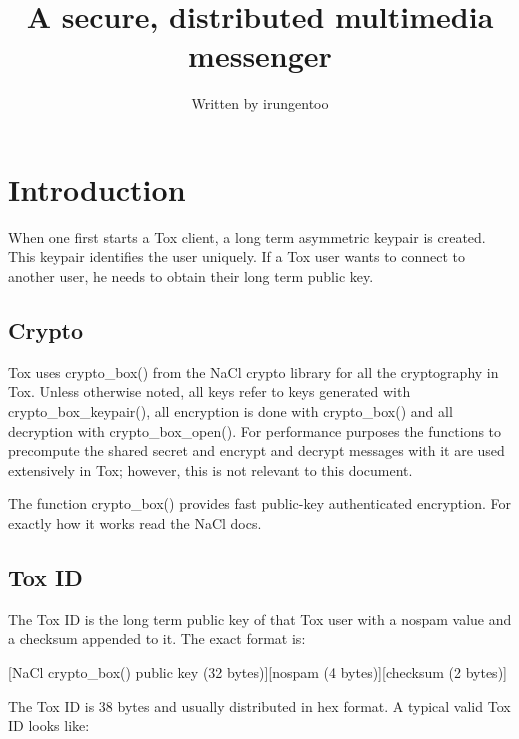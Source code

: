 \documentclass{tox}
\begin{document}
\title{A secure, distributed multimedia messenger}


\author{Written by irungentoo} %

\maketitle

\tableofcontents
\clearpage

\section{Introduction}

When one first starts a Tox client, a long term asymmetric keypair is created. 
This keypair identifies the user uniquely. If a Tox user wants to connect to 
another user, he needs to obtain their long term public key. 

\subsection{Crypto}

Tox uses crypto\_box() from the NaCl crypto library for all the cryptography in 
Tox. Unless otherwise noted, all keys refer to keys generated with 
crypto\_box\_keypair(), all encryption is done with crypto\_box() and all 
decryption with crypto\_box\_open(). For performance purposes the functions to 
precompute the shared secret and encrypt and decrypt messages with it are used 
extensively in Tox; however, this is not relevant to this document.

The function crypto\_box() provides fast public-key authenticated encryption. 
For exactly how it works read the NaCl docs.

\subsection{Tox ID}

The Tox ID is the long term public key of that Tox user with a nospam value and 
a checksum appended to it. The exact format is:

[NaCl crypto\_box() public key (32 bytes)][nospam (4 bytes)][checksum (2 bytes)]

The Tox ID is 38 bytes and usually distributed in hex format. A typical valid 
Tox ID looks like:
\end{document}
